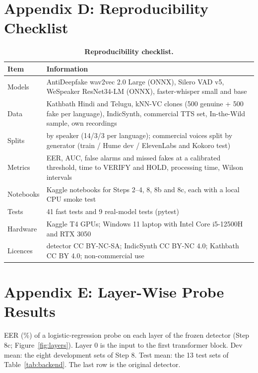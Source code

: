 \documentclass[10pt,a4paper,twocolumn]{article}
\begin{document}
\section{Appendix D: Reproducibility Checklist}
\begin{table}[H]
\centering\small
\caption{\textbf{Reproducibility checklist.}}
\begin{tabular}{@{}p{}p{}@{}}
\toprule
\textbf{Item} & \textbf{Information}\\
\midrule
Models & AntiDeepfake wav2vec 2.0 Large (ONNX), Silero VAD v5, WeSpeaker ResNet34-LM (ONNX), faster-whisper small and base\\
Data & Kathbath Hindi and Telugu, kNN-VC clones (500 genuine + 500 fake per language), IndicSynth, commercial TTS set, In-the-Wild sample, own recordings\\
Splits & by speaker (14/3/3 per language); commercial voices split by generator (train / Hume dev / ElevenLabs and Kokoro test)\\
Metrics & EER, AUC, false alarms and missed fakes at a calibrated threshold, time to VERIFY and HOLD, processing time, Wilson intervals\\
Notebooks & Kaggle notebooks for Steps 2--4, 8, 8b and 8c, each with a local CPU smoke test\\
Tests & 41 fast tests and 9 real-model tests (pytest)\\
Hardware & Kaggle T4 GPUs; Windows 11 laptop with Intel Core i5-12500H and RTX 3050\\
Licences & detector CC BY-NC-SA; IndicSynth CC BY-NC 4.0; Kathbath CC BY 4.0; non-commercial use\\
\bottomrule
\end{tabular}
\end{table}

\section{Appendix E: Layer-Wise Probe Results}
EER (\%) of a logistic-regression probe on each layer of the frozen detector (Step 8c; Figure~\ref{fig:layers}). Layer 0 is the input to the first transformer block. Dev mean: the eight development sets of Step 8. Test mean: the 13 test sets of Table~\ref{tab:backend}. The last row is the original detector.
\end{document}
